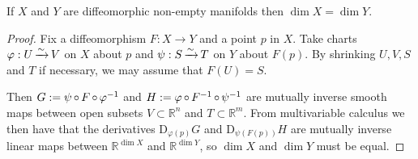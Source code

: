 \documentclass[a4paper,11pt]{article}
\begin{document}
	\begin{lem}
		If $X$ and $Y$ are diffeomorphic non-empty manifolds then $\dim X = \dim Y$.
	\end{lem}
	\begin{proof}
		Fix a diffeomorphism $F : X \to Y$ and a point $p$ in $X$. Take charts $\varphi : U \operatorname{\xrightarrow{\sim}} V$ on $X$ about $p$ and $\psi : S \operatorname{\xrightarrow{\sim}} T$ on $Y$ about $F(p)$. By shrinking $U,V,S$ and $T$ if necessary, we may assume that $F(U)=S$.
		
		Then $G: = \psi \operatorname{\circ} F \operatorname{\circ} \varphi^{-1}$ and $H := \varphi \operatorname{\circ} F^{-1} \operatorname{\circ} \psi^{-1}$ are mutually inverse smooth maps between open subsets $V \subset \mathbb{R}^n$ and $T \subset \mathbb{R}^m$. From multivariable calculus we then have that the derivatives $\mathrm{D}_{\varphi(p)}G$ and $\mathrm{D}_{\psi(F(p))} H$ are mutually inverse linear maps between $\mathbb{R}^{\dim X}$ and $\mathbb{R}^{\dim Y}$, so $\dim X$ and $\dim Y$ must be equal.
	\end{proof}
\end{document}
